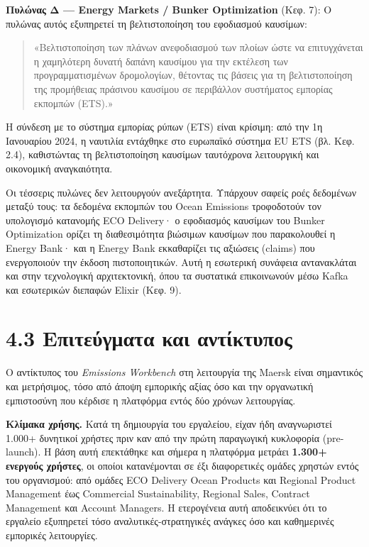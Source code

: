 \documentclass[11pt,a4paper,greek,twoside]{template-xe}
\begin{document}
\textbf{Πυλώνας Δ --- Energy Markets / Bunker Optimization} (Κεφ. 7): Ο
πυλώνας αυτός εξυπηρετεί τη βελτιστοποίηση του εφοδιασμού καυσίμων:

\begin{quote}
«Βελτιστοποίηση των πλάνων ανεφοδιασμού των πλοίων ώστε να επιτυγχάνεται
η χαμηλότερη δυνατή δαπάνη καυσίμου για την εκτέλεση των
προγραμματισμένων δρομολογίων, θέτοντας τις βάσεις για τη βελτιστοποίηση
της προμήθειας πράσινου καυσίμου σε περιβάλλον συστήματος εμπορίας
εκπομπών (ETS).»
\end{quote}

Η σύνδεση με το σύστημα εμπορίας ρύπων (ETS) είναι κρίσιμη: από την 1η
Ιανουαρίου 2024, η ναυτιλία εντάχθηκε στο ευρωπαϊκό σύστημα EU ETS (βλ.
Κεφ. 2.4), καθιστώντας τη βελτιστοποίηση καυσίμων ταυτόχρονα λειτουργική
και οικονομική αναγκαιότητα.

Οι τέσσερις πυλώνες δεν λειτουργούν ανεξάρτητα. Υπάρχουν σαφείς ροές
δεδομένων μεταξύ τους: τα δεδομένα εκπομπών του Ocean Emissions
τροφοδοτούν τον υπολογισμό κατανομής ECO Delivery· ο εφοδιασμός καυσίμων
του Bunker Optimization ορίζει τη διαθεσιμότητα βιώσιμων καυσίμων που
παρακολουθεί η Energy Bank· και η Energy Bank εκκαθαρίζει τις αξιώσεις
(claims) που ενεργοποιούν την έκδοση πιστοποιητικών. Αυτή η εσωτερική
συνάφεια αντανακλάται και στην τεχνολογική αρχιτεκτονική, όπου τα
συστατικά επικοινωνούν μέσω Kafka και εσωτερικών διεπαφών Elixir (Κεφ.
9).

\section{4.3 Επιτεύγματα και
αντίκτυπος}\label{ux3b5ux3c0ux3b9ux3c4ux3b5ux3cdux3b3ux3bcux3b1ux3c4ux3b1-ux3baux3b1ux3b9-ux3b1ux3bdux3c4ux3afux3baux3c4ux3c5ux3c0ux3bfux3c2}

Ο αντίκτυπος του \emph{Emissions Workbench} στη λειτουργία της Maersk
είναι σημαντικός και μετρήσιμος, τόσο από άποψη εμπορικής αξίας όσο και
την οργανωτική εμπιστοσύνη που κέρδισε η πλατφόρμα εντός δύο χρόνων
λειτουργίας.

\textbf{Κλίμακα χρήσης.} Κατά τη δημιουργία του εργαλείου, είχαν ήδη
αναγνωριστεί 1.000+ δυνητικοί χρήστες πριν καν από την πρώτη παραγωγική
κυκλοφορία (pre-launch). Η βάση αυτή επεκτάθηκε και σήμερα η πλατφόρμα
μετράει \textbf{1.300+ ενεργούς χρήστες}, οι οποίοι κατανέμονται σε έξι
διαφορετικές ομάδες χρηστών εντός του οργανισμού: από ομάδες ECO
Delivery Ocean Products και Regional Product Management έως Commercial
Sustainability, Regional Sales, Contract Management και Account
Managers. Η ετερογένεια αυτή αποδεικνύει ότι το εργαλείο εξυπηρετεί τόσο
αναλυτικές-στρατηγικές ανάγκες όσο και καθημερινές εμπορικές
λειτουργίες.
\end{document}
